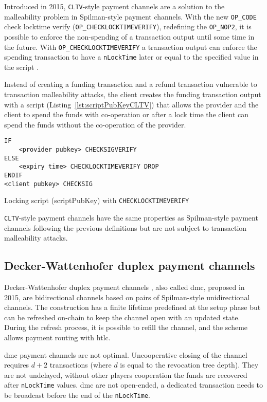 Introduced in 2015, \texttt{CLTV}-style payment channels are a solution to the malleability
problem in Spilman-style payment channels. With the new \texttt{OP\_CODE} check
locktime verify (\texttt{OP\_CHECKLOCKTIMEVERIFY}), redefining the
\texttt{OP\_NOP2}, it is possible to enforce the non-spending of a transaction
output until some time in the future. With \texttt{OP\_CHECKLOCKTIMEVERIFY} a
transaction output can enforce the spending transaction to have a
\texttt{nLockTime} later or equal to the specified value in the script
\cite{BIP65}.

Instead of creating a funding transaction and a refund transaction vulnerable to
transaction malleability attacks, the client creates the funding transaction
output with a script (Listing~\ref{lst:scriptPubKeyCLTV}) that allows the
provider and the client to spend the funds
with co-operation or after a lock time the client can spend the funds without
the co-operation of the provider.

\begin{listing}
  \begin{verbatim}
IF
    <provider pubkey> CHECKSIGVERIFY
ELSE
    <expiry time> CHECKLOCKTIMEVERIFY DROP
ENDIF
<client pubkey> CHECKSIG
  \end{verbatim}
	\caption{Locking script (scriptPubKey) with \texttt{CHECKLOCKTIMEVERIFY}}
	\label{lst:scriptPubKeyCLTV}
\end{listing}

\texttt{CLTV}-style payment channels have the same properties as Spilman-style payment
channels following the previous definitions but are not subject to transaction
malleability attacks.


\subsection{Decker-Wattenhofer duplex payment channels}

Decker-Wattenhofer duplex payment channels \cite{Decker2015fast}, also called
\gls{dmc}, proposed in 2015, are bidirectional channels based on pairs of
Spilman-style unidirectional channels. The construction has a finite lifetime
predefined at the setup phase but can be refreshed on-chain to keep the channel
open with an updated state. During the refresh process, it is possible to refill
the channel, and the scheme allows payment routing with \gls{htlc}.

\gls{dmc} payment channels are not optimal. Uncooperative closing of the channel
requires $d + 2$ transactions (where $d$ is equal to the revocation tree depth).
They are not undelayed, without other players cooperation the funds are
recovered after \texttt{nLockTime} values. \gls{dmc} are not open-ended, a
dedicated transaction needs to be broadcast before the end of the
\texttt{nLockTime}.

